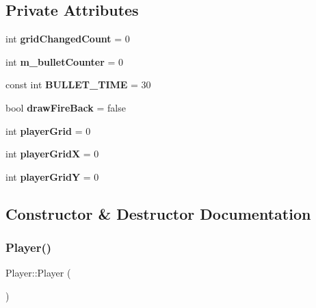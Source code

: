 \subsection*{Private Attributes}
\begin{DoxyCompactItemize}
\item 
\mbox{\label{class_player_a07b025ffb333ac63c2425715bc363cf4}} 
int {\bfseries grid\+Changed\+Count} = 0
\item 
\mbox{\label{class_player_a2bf87c23e91349f6462477c0f91ae266}} 
int {\bfseries m\+\_\+bullet\+Counter} = 0
\item 
\mbox{\label{class_player_acec711e7c815af7f5d0e4f0efa105293}} 
const int {\bfseries B\+U\+L\+L\+E\+T\+\_\+\+T\+I\+ME} = 30
\item 
\mbox{\label{class_player_a304f5c8e09020e26cb0a3542cf09d5c6}} 
bool {\bfseries draw\+Fire\+Back} = false
\item 
\mbox{\label{class_player_a23bd4188bb44baeb9264407662f586ea}} 
int {\bfseries player\+Grid} = 0
\item 
\mbox{\label{class_player_a5f88aaf7ceda015e37472c8604db9f15}} 
int {\bfseries player\+GridX} = 0
\item 
\mbox{\label{class_player_ac3b3f3679af4672d11e2865e1da8addb}} 
int {\bfseries player\+GridY} = 0
\end{DoxyCompactItemize}


\subsection{Constructor \& Destructor Documentation}
\mbox{\label{class_player_affe0cc3cb714f6deb4e62f0c0d3f1fd8}} 
\subsubsection{\texorpdfstring{Player()}{Player()}}
{\footnotesize\ttfamily Player\+::\+Player (\begin{DoxyParamCaption}{ }\end{DoxyParamCaption})}



